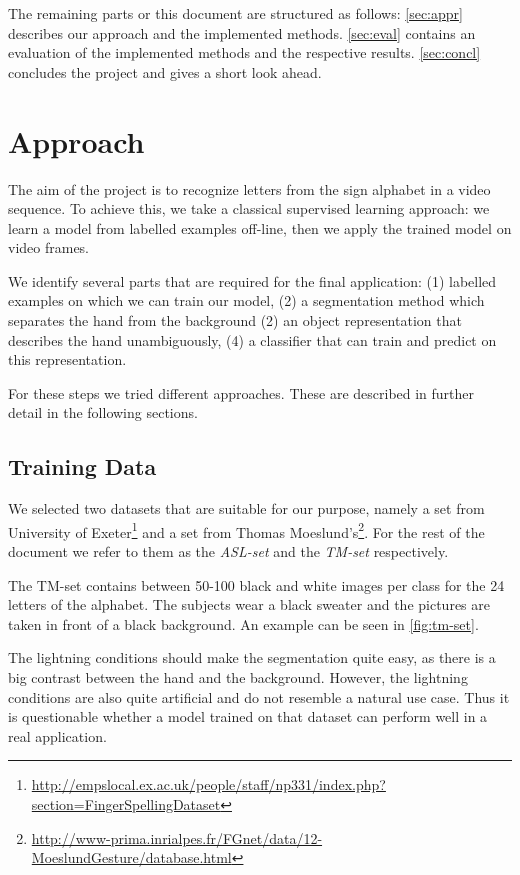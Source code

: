 \documentclass[letterpaper, 10 pt, conference]{ieeeconf}  %
\begin{document}
The remaining parts or this document are structured as follows: \autoref{sec:appr} describes our approach and the implemented methods. \autoref{sec:eval} contains an evaluation of the implemented methods and the respective results. \autoref{sec:concl} concludes the project and gives a short look ahead.


\section{Approach}
\label{sec:appr}
The aim of the project is to recognize letters from the sign alphabet in a video sequence. To achieve this, we take a classical supervised learning approach: we learn a model from labelled examples off-line, then we apply the trained model on video frames.

We identify several parts that are required for the final application: (1) labelled examples on which we can train our model, (2) a segmentation method which separates the hand from the background (2) an object representation that describes the hand unambiguously, (4) a classifier that can train and predict on this representation.

For these steps we tried different approaches. These are described in further detail in the following sections. 

\subsection{Training Data}

We selected two datasets that are suitable for our purpose, namely a set from University of Exeter\footnote{\url{http://empslocal.ex.ac.uk/people/staff/np331/index.php?section=FingerSpellingDataset}} and a set from Thomas Moeslund's\footnote{\url{http://www-prima.inrialpes.fr/FGnet/data/12-MoeslundGesture/database.html}}. For the rest of the document we refer to them as the \textit{ASL-set} and the \textit{TM-set} respectively.

The TM-set contains between 50-100 black and white images per class for the 24 letters of the alphabet. The subjects wear a black sweater and the pictures are taken in front of a black background. An example can be seen in \autoref{fig:tm-set}.

The lightning conditions should make the segmentation quite easy, as there is a big contrast between the hand and the background. However, the lightning conditions are also quite artificial and do not resemble a natural use case. Thus it is questionable whether a model trained on that dataset can perform well in a real application.
\end{document}
